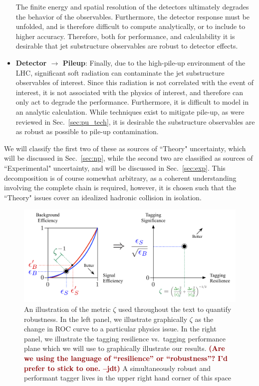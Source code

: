 \documentclass[11pt,letterpaper]{article}
\DeclareRobustCommand{\Sec}[1]{Sec.~\ref{#1}}
\newcommand{\jdt}[1]{\textbf{\textcolor{darkred}{(#1 --jdt)}}}
\begin{document}
\begin{itemize}
%
The finite energy and spatial resolution of the detectors ultimately degrades the behavior of the observables.
%
Furthermore, the detector response must be unfolded, and is therefore difficult to compute analytically, or to include to higher accuracy. Therefore, both for performance, and calculability it is desirable that jet substructure observables are robust to detector effects.
%
\item {\bf Detector $\to$ Pileup}: Finally, due to the high-pile-up environment of the LHC, significant soft radiation can contaminate the jet substructure observables of interest.
%
Since this radiation is not correlated with the event of interest, it is not associated with the physics of interest, and therefore can only act to degrade the performance.
%
Furthermore, it is difficult to model in an analytic calculation.
%
While techniques exist to mitigate pile-up, as were reviewed in \Sec{sec:pu_tech}, it is desirable the substructure observables are as robust as possible to pile-up contamination.
%
\end{itemize}
%
We will classify the first two of these as sources of ``Theory" uncertainty, which will be discussed in \Sec{sec:np}, while the second two are classified as sources of ``Experimental" uncertainty, and will be discussed in \Sec{sec:exp}. This decomposition is of course somewhat arbitrary, as a coherent understanding involving the complete chain is required, however, it is chosen such that the ``Theory" issues cover an idealized hadronic collision in isolation. 

\begin{figure}[t]
\begin{center}
\includegraphics[width=1.0\columnwidth]{figures/roc_to_significance}
\end{center}
\caption{An illustration of the metric $\zeta$ used throughout the text to quantify robustness. In the left panel, we illustrate graphically $\zeta$ as the change in ROC curve to a particular physics issue. In the right panel, we illustrate the tagging resilience vs.\ tagging performance plane which we will use to graphically illustrate our results. \jdt{Are we using the language of ``resilience'' or ``robustness''?  I'd prefer to stick to one.}  A simultaneously robust and performant tagger lives in the upper right hand corner of this space}
\label{fig:zeta_def}
\end{figure}
\end{document}
